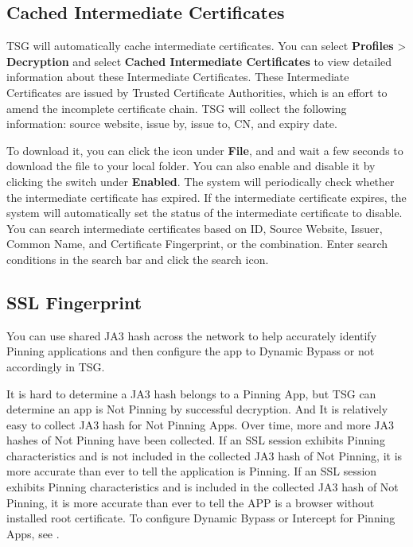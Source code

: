 \subsection*{\hypertarget{link:Cached Intermediate Certificates}{Cached Intermediate Certificates}}
\label{sec:decrypt:certificate:cached}

TSG will automatically cache intermediate certificates. You can select \textbf{Profiles} > \textbf{Decryption} 
and select \textbf{Cached Intermediate Certificates} to view detailed information about these Intermediate Certificates. 
These Intermediate Certificates are issued by Trusted Certificate Authorities, which is an effort to amend the incomplete certificate chain. 
TSG will collect the following information: source website, issue by, issue to, CN, and expiry date.


To download it, you can click the icon under \textbf{File}, and and wait a few seconds to download the file to your local folder. 
You can also enable and disable it by clicking the switch under \textbf{Enabled}. 
The system will periodically check whether the intermediate certificate has expired. 
If the intermediate certificate expires, the system will automatically set the status of the intermediate certificate to disable. 
You can search intermediate certificates based on ID, Source Website, Issuer, Common Name, and Certificate Fingerprint, or the combination. 
Enter search conditions in the search bar and click the search icon.

\subsection*{\hypertarget{link:SSL Fingerprint}{SSL Fingerprint}}
\label{sec:decrypt:certificate:fingerprint}

You can use shared JA3 hash across the network to help accurately identify Pinning applications and then configure the app to Dynamic Bypass or not accordingly in TSG. 


It is hard to determine a JA3 hash belongs to a Pinning App, but TSG can determine an app is Not Pinning by successful decryption. 
And It is relatively easy to collect JA3 hash for Not Pinning Apps. Over time, more and more JA3 hashes of Not Pinning have been collected. 
If an SSL session exhibits Pinning characteristics and is not included in the collected JA3 hash of Not Pinning, it is more accurate than ever to tell the application is Pinning. 
If an SSL session exhibits Pinning characteristics and is included in the collected JA3 hash of Not Pinning, 
it is more accurate than ever to tell the APP is a browser without installed root certificate. To configure Dynamic Bypass or Intercept for Pinning Apps, see 
\hyperlink{link:Decryption Profile}{\color{linkblue}{Decryption Profile}}.


